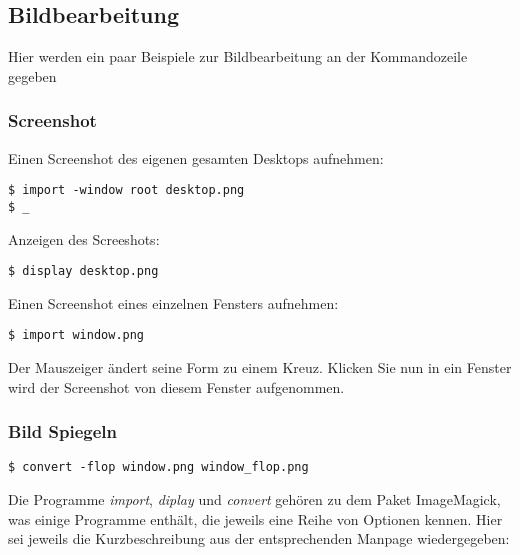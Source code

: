 \documentclass[titlepage,a4paper]{article}
\begin{document}
\subsection{Bildbearbeitung}

Hier werden ein paar Beispiele zur Bildbearbeitung an der Kommandozeile gegeben

\subsubsection*{Screenshot}

\noindent
Einen Screenshot des eigenen gesamten Desktops aufnehmen:

\begin{verbatim}
$ import -window root desktop.png
$ _
\end{verbatim}

\noindent
Anzeigen des Screeshots:

\begin{verbatim}
$ display desktop.png
\end{verbatim}

\noindent
Einen Screenshot eines einzelnen Fensters aufnehmen:

\begin{verbatim}
$ import window.png

\end{verbatim}

\noindent
Der Mauszeiger ändert seine Form zu einem Kreuz.  Klicken Sie nun in ein Fenster
wird der Screenshot von diesem Fenster aufgenommen.

\subsubsection*{Bild Spiegeln}

\begin{verbatim}
$ convert -flop window.png window_flop.png
\end{verbatim}

Die Programme \emph{import}, \emph{diplay} und \emph{convert} gehören zu dem Paket ImageMagick,
was einige Programme enthält, die jeweils eine Reihe von Optionen kennen.  Hier sei jeweils
die Kurzbeschreibung aus der entsprechenden Manpage wiedergegeben:
\end{document}
